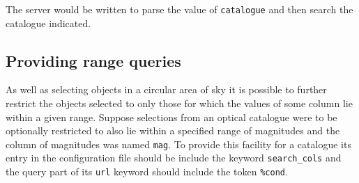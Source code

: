 \documentclass[twoside,11pt,nolof,chapters]{starlink}
\begin{document}
The server would be written to parse the value of \texttt{catalogue} and then
search the catalogue indicated.

\subsection{Providing range queries}

As well as selecting objects in a circular area of sky it is possible
to further restrict the objects selected to only those for which the
values of some column lie within a given range.  Suppose selections
from an optical catalogue were to be optionally restricted to also
lie within a specified range of magnitudes and the column of magnitudes
was named \texttt{mag}.  To provide this facility for a catalogue its entry in
the configuration file should be include the keyword \texttt{search\_cols}
and the query part of its \texttt{url} keyword should include the token
\texttt{\%cond}.
\end{document}
